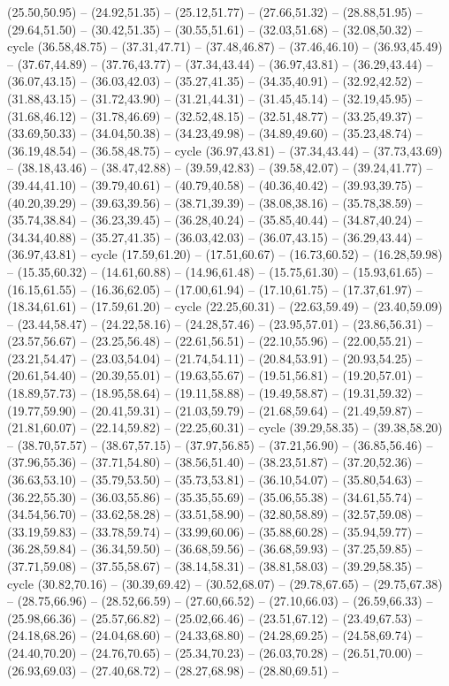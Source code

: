 {(25.50,50.95) -- (24.92,51.35) -- (25.12,51.77) -- (27.66,51.32) -- (28.88,51.95) -- (29.64,51.50) -- (30.42,51.35) -- (30.55,51.61) -- (32.03,51.68) -- (32.08,50.32) -- cycle (36.58,48.75) -- (37.31,47.71) -- (37.48,46.87) -- (37.46,46.10) -- (36.93,45.49) -- (37.67,44.89) -- (37.76,43.77) -- (37.34,43.44) -- (36.97,43.81) -- (36.29,43.44) -- (36.07,43.15) -- (36.03,42.03) -- (35.27,41.35) -- (34.35,40.91) -- (32.92,42.52) -- (31.88,43.15) -- (31.72,43.90) -- (31.21,44.31) -- (31.45,45.14) -- (32.19,45.95) -- (31.68,46.12) -- (31.78,46.69) -- (32.52,48.15) -- (32.51,48.77) -- (33.25,49.37) -- (33.69,50.33) -- (34.04,50.38) -- (34.23,49.98) -- (34.89,49.60) -- (35.23,48.74) -- (36.19,48.54) -- (36.58,48.75) -- cycle (36.97,43.81) -- (37.34,43.44) -- (37.73,43.69) -- (38.18,43.46) -- (38.47,42.88) -- (39.59,42.83) -- (39.58,42.07) -- (39.24,41.77) -- (39.44,41.10) -- (39.79,40.61) -- (40.79,40.58) -- (40.36,40.42) -- (39.93,39.75) -- (40.20,39.29) -- (39.63,39.56) -- (38.71,39.39) -- (38.08,38.16) -- (35.78,38.59) -- (35.74,38.84) -- (36.23,39.45) -- (36.28,40.24) -- (35.85,40.44) -- (34.87,40.24) -- (34.34,40.88) -- (35.27,41.35) -- (36.03,42.03) -- (36.07,43.15) -- (36.29,43.44) -- (36.97,43.81) -- cycle (17.59,61.20) -- (17.51,60.67) -- (16.73,60.52) -- (16.28,59.98) -- (15.35,60.32) -- (14.61,60.88) -- (14.96,61.48) -- (15.75,61.30) -- (15.93,61.65) -- (16.15,61.55) -- (16.36,62.05) -- (17.00,61.94) -- (17.10,61.75) -- (17.37,61.97) -- (18.34,61.61) -- (17.59,61.20) -- cycle (22.25,60.31) -- (22.63,59.49) -- (23.40,59.09) -- (23.44,58.47) -- (24.22,58.16) -- (24.28,57.46) -- (23.95,57.01) -- (23.86,56.31) -- (23.57,56.67) -- (23.25,56.48) -- (22.61,56.51) -- (22.10,55.96) -- (22.00,55.21) -- (23.21,54.47) -- (23.03,54.04) -- (21.74,54.11) -- (20.84,53.91) -- (20.93,54.25) -- (20.61,54.40) -- (20.39,55.01) -- (19.63,55.67) -- (19.51,56.81) -- (19.20,57.01) -- (18.89,57.73) -- (18.95,58.64) -- (19.11,58.88) -- (19.49,58.87) -- (19.31,59.32) -- (19.77,59.90) -- (20.41,59.31) -- (21.03,59.79) -- (21.68,59.64) -- (21.49,59.87) -- (21.81,60.07) -- (22.14,59.82) -- (22.25,60.31) -- cycle (39.29,58.35) -- (39.38,58.20) -- (38.70,57.57) -- (38.67,57.15) -- (37.97,56.85) -- (37.21,56.90) -- (36.85,56.46) -- (37.96,55.36) -- (37.71,54.80) -- (38.56,51.40) -- (38.23,51.87) -- (37.20,52.36) -- (36.63,53.10) -- (35.79,53.50) -- (35.73,53.81) -- (36.10,54.07) -- (35.80,54.63) -- (36.22,55.30) -- (36.03,55.86) -- (35.35,55.69) -- (35.06,55.38) -- (34.61,55.74) -- (34.54,56.70) -- (33.62,58.28) -- (33.51,58.90) -- (32.80,58.89) -- (32.57,59.08) -- (33.19,59.83) -- (33.78,59.74) -- (33.99,60.06) -- (35.88,60.28) -- (35.94,59.77) -- (36.28,59.84) -- (36.34,59.50) -- (36.68,59.56) -- (36.68,59.93) -- (37.25,59.85) -- (37.71,59.08) -- (37.55,58.67) -- (38.14,58.31) -- (38.81,58.03) -- (39.29,58.35) -- cycle (30.82,70.16) -- (30.39,69.42) -- (30.52,68.07) -- (29.78,67.65) -- (29.75,67.38) -- (28.75,66.96) -- (28.52,66.59) -- (27.60,66.52) -- (27.10,66.03) -- (26.59,66.33) -- (25.98,66.36) -- (25.57,66.82) -- (25.02,66.46) -- (23.51,67.12) -- (23.49,67.53) -- (24.18,68.26) -- (24.04,68.60) -- (24.33,68.80) -- (24.28,69.25) -- (24.58,69.74) -- (24.40,70.20) -- (24.76,70.65) -- (25.34,70.23) -- (26.03,70.28) -- (26.51,70.00) -- (26.93,69.03) -- (27.40,68.72) -- (28.27,68.98) -- (28.80,69.51) -- }
